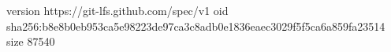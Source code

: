 version https://git-lfs.github.com/spec/v1
oid sha256:b8e8b0eb953ca5e98223de97ca3c8adb0e1836eaec3029f5f5ca6a859fa23514
size 87540

